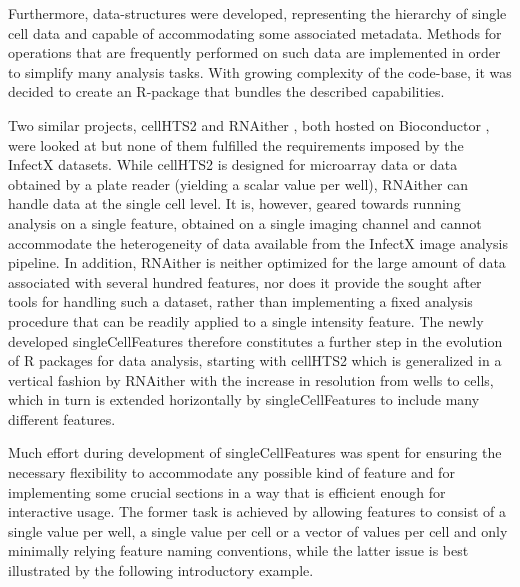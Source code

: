 Furthermore, data-structures were developed, representing the hierarchy of single cell  data and capable of accommodating some associated metadata. Methods for operations that are frequently performed on such data are implemented in order to simplify many analysis tasks. With growing complexity of the code-base, it was decided to create an R-package that bundles the described capabilities.

Two similar projects, cellHTS2 \citep{Boutros2006} and RNAither \citep{Rieber2009}, both hosted on Bioconductor \citep{Huber2015}, were looked at but none of them fulfilled the requirements imposed by the InfectX datasets. While cellHTS2 is designed for microarray data or  data obtained by a plate reader (yielding a scalar value per well), RNAither can handle data at the single cell level. It is, however, geared towards running analysis on a single feature, obtained on a single imaging channel and cannot accommodate the heterogeneity of data available from the InfectX image analysis pipeline. In addition, RNAither is neither optimized for the large amount of data associated with several hundred features, nor does it provide the sought after tools for handling such a dataset, rather than implementing a fixed analysis procedure that can be readily applied to a single intensity feature. The newly developed singleCellFeatures therefore constitutes a further step in the evolution of R packages for  data analysis, starting with cellHTS2 which is generalized in a vertical fashion by RNAither with the increase in resolution from wells to cells, which in turn is extended horizontally by singleCellFeatures to include many different features.

Much effort during development of singleCellFeatures was spent for ensuring the necessary flexibility to accommodate any possible kind of feature and for implementing some crucial sections in a way that is efficient enough for interactive usage. The former task is achieved by allowing features to consist of a single value per well, a single value per cell or a vector of values per cell and only minimally relying feature naming conventions, while the latter issue is best illustrated by the following introductory example.





